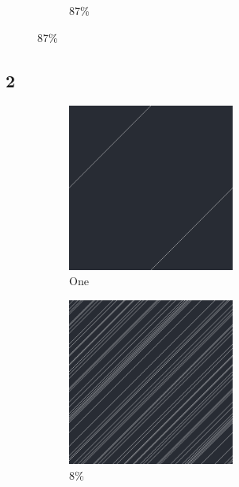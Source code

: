 \documentclass[12pt, fleqn]{report}                             %
\theoremstyle{break}                                            %
\begin{document}
\begin{figure}[ht!]
\begin{subfigure}[b]{0.4\linewidth}
          \caption{87\%}
        \end{subfigure}
      \end{figure}


      \clearpage
      \subsection{2}
      \begin{figure}[ht!]
        \centering
        \begin{subfigure}[b]{0.4\linewidth}
          \includegraphics[width=0.6\textwidth]{Images/2/a.png}
          \caption{One}
        \end{subfigure}
        \begin{subfigure}[b]{0.4\linewidth}
          \includegraphics[width=0.6\textwidth]{Images/2/b.png}
          \caption{8\%}
        \end{subfigure}
        \begin{subfigure}[b]{0.4\linewidth}

\end{subfigure}
\end{figure}
\end{document}
